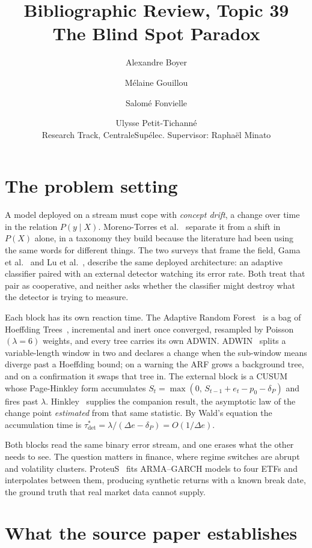 \documentclass[10pt,a4paper]{article}
\title{\vspace{-1.2cm}Bibliographic Review, Topic 39\\[0.2em]
\large The Blind Spot Paradox}
\author{Alexandre Boyer \and Mélaine Gouillou \and Salomé Fonvielle \and Ulysse Petit-Tichanné\\[0.2em]
\normalsize Research Track, CentraleSupélec. Supervisor: Raphaël Minato}
\date{}
\begin{document}
\maketitle
\vspace{-1.4em}

\section{The problem setting}

A model deployed on a stream must cope with \emph{concept drift}, a change over time in
the relation $P(y\mid X)$. Moreno-Torres et al.~\cite{moreno2012} separate it from a shift
in $P(X)$ alone, in a taxonomy they build because the literature had been using the same
words for different things. The two surveys that frame the field, Gama et al.~\cite{gama2014}
and Lu et al.~\cite{lu2018}, describe the same deployed architecture: an adaptive classifier
paired with an external detector watching its error rate. Both treat that pair as
cooperative, and neither asks whether the classifier might destroy what the detector is
trying to measure.

Each block has its own reaction time. The Adaptive Random Forest~\cite{gomes2017} is a bag
of Hoeffding Trees~\cite{domingos2000}, incremental and inert once converged, resampled by
Poisson$(\lambda{=}6)$ weights, and every tree carries its own ADWIN. ADWIN~\cite{bifet2007}
splits a variable-length window in two and declares a change when the sub-window means
diverge past a Hoeffding bound; on a warning the ARF grows a background tree, and on a
confirmation it swaps that tree in. The external block is a CUSUM~\cite{page1954} whose
Page-Hinkley form accumulates $S_t=\max(0,\,S_{t-1}+e_t-p_0-\delta_P)$ and fires past
$\lambda$. Hinkley~\cite{hinkley1971} supplies the companion result, the asymptotic law of
the change point \emph{estimated} from that same statistic. By Wald's equation the
accumulation time is $\tau^{*}_{\det}=\lambda/(\Delta e-\delta_P)=O(1/\Delta e)$.

Both blocks read the same binary error stream, and one erases what the other needs to see.
The question matters in finance, where regime switches are abrupt and volatility clusters.
ProteuS~\cite{suarez2025} fits ARMA--GARCH models to four ETFs and interpolates between
them, producing synthetic returns with a known break date, the ground truth that real
market data cannot supply.

\section{What the source paper establishes}
\end{document}
